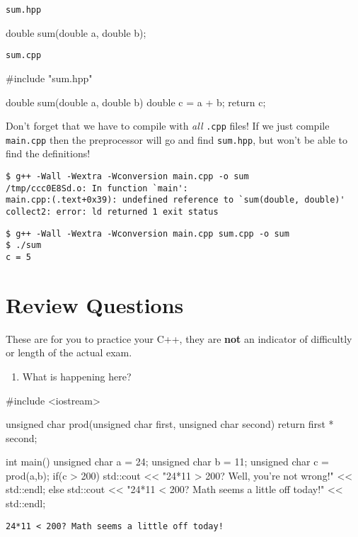 \documentclass[12pt,letterpaper,twoside]{article}
\begin{document}
\texttt{sum.hpp}
\begin{cpp}
double sum(double a, double b);
\end{cpp}

\texttt{sum.cpp}
\begin{cpp}
#include "sum.hpp"

double sum(double a, double b) {
  double c = a + b;
  return c;
}
\end{cpp}

Don't forget that we have to compile with \textit{all} \texttt{.cpp} files! If we just compile \texttt{main.cpp} then the preprocessor will go and find \texttt{sum.hpp}, but won't be able to find the definitions!

{\footnotesize
\begin{verbatim}
$ g++ -Wall -Wextra -Wconversion main.cpp -o sum
/tmp/ccc0E8Sd.o: In function `main':
main.cpp:(.text+0x39): undefined reference to `sum(double, double)'
collect2: error: ld returned 1 exit status
\end{verbatim}}

{\footnotesize
\begin{verbatim}
$ g++ -Wall -Wextra -Wconversion main.cpp sum.cpp -o sum
$ ./sum
c = 5
\end{verbatim}}


\newpage

\section{Review Questions}

These are for you to practice your C++, they are \textbf{not} an indicator of difficultly or length of the actual exam.

\begin{enumerate}
\item What is happening here?
\end{enumerate}
\begin{cpp}
#include <iostream>

unsigned char prod(unsigned char first, unsigned char second){
  return first * second;
}

int main() {
  unsigned char a = 24;
  unsigned char b = 11;
  unsigned char c = prod(a,b);
  if(c > 200){
    std::cout << "24*11 > 200? Well, you're not wrong!" << std::endl;
  }
  else{
    std::cout << "24*11 < 200? Math seems a little off today!" << std::endl;
  }
}
\end{cpp}
\vspace{-3ex}
{
\footnotesize
\begin{verbatim}
24*11 < 200? Math seems a little off today!
\end{verbatim}
}
\bigskip
\end{document}
